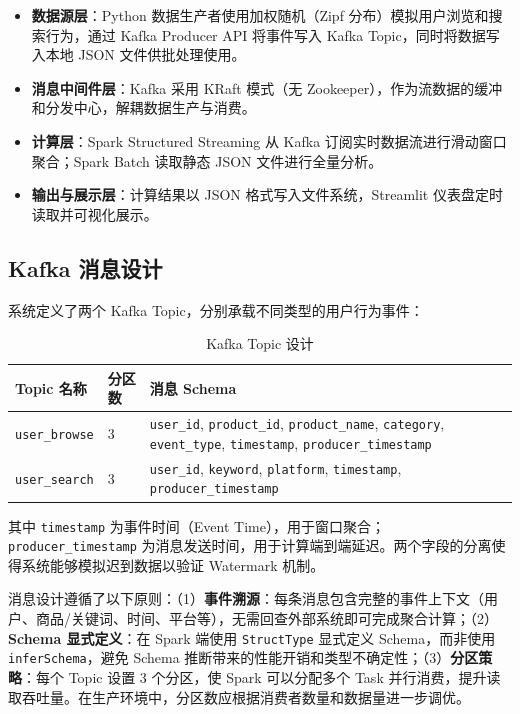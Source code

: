\documentclass[12pt,a4paper]{article}
\begin{document}
\begin{itemize}    \item \textbf{数据源层}：Python 数据生产者使用加权随机（Zipf 分布）模拟用户浏览和搜索行为，通过 Kafka Producer API 将事件写入 Kafka Topic，同时将数据写入本地 JSON 文件供批处理使用。
    \item \textbf{消息中间件层}：Kafka 采用 KRaft 模式（无 Zookeeper），作为流数据的缓冲和分发中心，解耦数据生产与消费。
    \item \textbf{计算层}：Spark Structured Streaming 从 Kafka 订阅实时数据流进行滑动窗口聚合；Spark Batch 读取静态 JSON 文件进行全量分析。
    \item \textbf{输出与展示层}：计算结果以 JSON 格式写入文件系统，Streamlit 仪表盘定时读取并可视化展示。
\end{itemize}

\subsection{Kafka 消息设计}

系统定义了两个 Kafka Topic，分别承载不同类型的用户行为事件：

\begin{table}[H]
\centering
\caption{Kafka Topic 设计}
\label{tab:kafka-topics}
\begin{tabular}{llp{7cm}}
\toprule
\textbf{Topic 名称} & \textbf{分区数} & \textbf{消息 Schema} \\
\midrule
\texttt{user\_browse} & 3 & \texttt{user\_id}, \texttt{product\_id}, \texttt{product\_name}, \texttt{category}, \texttt{event\_type}, \texttt{timestamp}, \texttt{producer\_timestamp} \\
\texttt{user\_search} & 3 & \texttt{user\_id}, \texttt{keyword}, \texttt{platform}, \texttt{timestamp}, \texttt{producer\_timestamp} \\
\bottomrule
\end{tabular}
\end{table}

其中 \texttt{timestamp} 为事件时间（Event Time），用于窗口聚合；\texttt{producer\_timestamp} 为消息发送时间，用于计算端到端延迟。两个字段的分离使得系统能够模拟迟到数据以验证 Watermark 机制。

消息设计遵循了以下原则：（1）\textbf{事件溯源}：每条消息包含完整的事件上下文（用户、商品/关键词、时间、平台等），无需回查外部系统即可完成聚合计算；（2）\textbf{Schema 显式定义}：在 Spark 端使用 \texttt{StructType} 显式定义 Schema，而非使用 \texttt{inferSchema}，避免 Schema 推断带来的性能开销和类型不确定性；（3）\textbf{分区策略}：每个 Topic 设置 3 个分区，使 Spark 可以分配多个 Task 并行消费，提升读取吞吐量。在生产环境中，分区数应根据消费者数量和数据量进一步调优。
\end{document}
